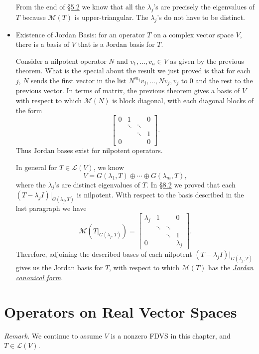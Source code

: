 \documentclass[11pt]{article}
\newcommand{\lk}[2]{\hyperlink{subsection.#1.#2}{\S#1.#2}}
\newcommand{\df}[1]{\ul{\textit{\textsf{#1}}}}
\newcommand{\LV}{\mathcal{L}(V)}
\newcommand{\M}{\mathcal{M}}
\begin{document}
\begin{itemize}
    From the end of \lk{5}{2} we know that all the $\lambda_j$'s are precisely the eigenvalues of $T$ because $\M(T)$ is upper-triangular. The $\lambda_j$'s do not have to be distinct.
    \item Existence of Jordan Basis: for an operator $T$ on a complex vector space $V$, there is a basis of $V$ that is a Jordan basis for $T$.

    Consider a nilpotent operator $N$ and $v_1,\dots,v_n \in V$ as given by the previous theorem. What is the special about the result we just proved is that for each $j$, $N$ sends the first vector in the list $N^{m_j}v_j,\dots,Nv_j,v_j$ to 0 and the rest to the previous vector. In terms of matrix, the previous theorem gives a basis of $V$ with respect to which $\M(N)$ is block diagonal, with each diagonal blocks of the form \[\begin{bmatrix}
        0 & 1 & & 0 \\
        & \ddots & \ddots & \\
        & & \ddots & 1 \\
        0 & & & 0
    \end{bmatrix}.\] Thus Jordan bases exist for nilpotent operators.
    
    In general for $T \in \LV$, we know \[V = G(\lambda_1,T) \oplus \cdots \oplus G(\lambda_m,T),\] where the $\lambda_j$'s are distinct eigenvalues of $T$. In \lk{8}{2} we proved that each $(T-\lambda_j I)|_{G(\lambda_j,T)}$ is nilpotent. With respect to the basis described in the last paragraph we have \[\M(T|_{G(\lambda_j,T)}) = \begin{bmatrix}
        \lambda_j & 1 & & 0 \\
        & \ddots & \ddots & \\
        & & \ddots & 1 \\
        0 & & & \lambda_j
    \end{bmatrix}.\] Therefore, adjoining the described bases of each nilpotent $(T-\lambda_j I)|_{G(\lambda_j,T)}$ gives us the Jordan basis for $T$, with respect to which $\M(T)$ has the \df{Jordan canonical form}.
\end{itemize}


\newpage
\section{Operators on Real Vector Spaces}
\textit{Remark.} We continue to assume $V$ is a nonzero FDVS in this chapter, and $T \in \LV$.
\end{document}
